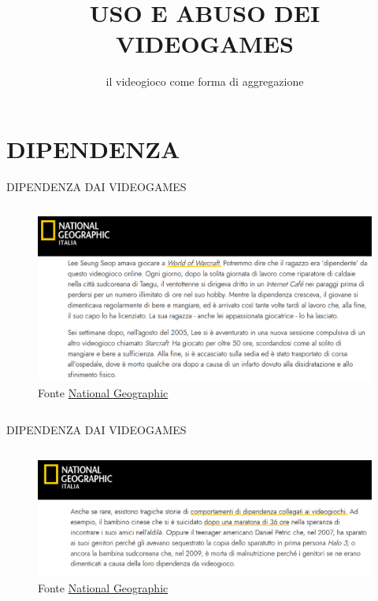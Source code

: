 \documentclass[aspectratio=1610]{beamer}
\title{USO E ABUSO DEI VIDEOGAMES}
\subtitle{il videogioco come forma di aggregazione}
\date{}
\institute{\textit{
        Fonti:
        \begin{itemize}
            \item[-] \href{https://it.wikipedia.org/wiki/Dipendenza_da_videogiochi}{Wikipedia}
            \item[-] \href{https://icd.who.int/en}{World Health Organization ICD}
            \item[-] \href{https://www.nationalgeographic.it/dipendenza-da-videogiochi-come-uscire-dal-tunnel}{National Geographic}
            \item[-] \href{https://www.treccani.it/vocabolario/community/}{Treccani} 
        \end{itemize}
    }
}
\begin{document}
\begin{frame}
    \titlepage
\end{frame}

\section{DIPENDENZA}

\begin{frame}{DIPENDENZA DAI VIDEOGAMES}
    \begin{columns}
        \column{\textwidth}
        \begin{figure}
            \includegraphics[width=\linewidth]{img/LeeSeungSeop.png}
            \caption{{Fonte \href{https://www.nationalgeographic.it/dipendenza-da-videogiochi-come-uscire-dal-tunnel}{National Geographic}}}
        \end{figure}
    \end{columns}
\end{frame}

\begin{frame}{DIPENDENZA DAI VIDEOGAMES}
    \begin{columns}
        \column{\textwidth}
        \begin{figure}
            \includegraphics[width=\linewidth]{img/esempi.png}
            \caption{{Fonte \href{https://www.nationalgeographic.it/dipendenza-da-videogiochi-come-uscire-dal-tunnel}{National Geographic}}}
        \end{figure}
    \end{columns}
\end{frame}
\end{document}
